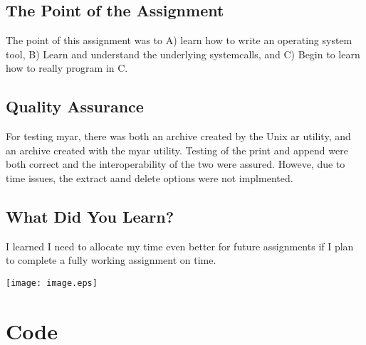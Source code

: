 \documentclass[letterpaper,10pt,titlepage]{article}
\begin{document}
\subsection{The Point of the Assignment}
\label{Point}
The point of this assignment was to A) learn how to write an operating system tool, B) Learn and understand the underlying systemcalls, and C) Begin to learn how to really program in C.
\subsection{Quality Assurance}
\label{QA}
For testing myar, there was both an archive created by the Unix ar utility, and an archive created with the myar utility. Testing of the print and append were both correct and the interoperability of the two were assured. Howeve, due to time issues, the extract aand delete options were not implmented.
\subsection{What Did You Learn?}
\label{Learned}
I learned I need to allocate my time even better for future assignments if I plan to complete a fully working assignment on time.

\texttt{[image: image.eps]}


\section{Code}
\label{myar Source Code}

\end{document}
